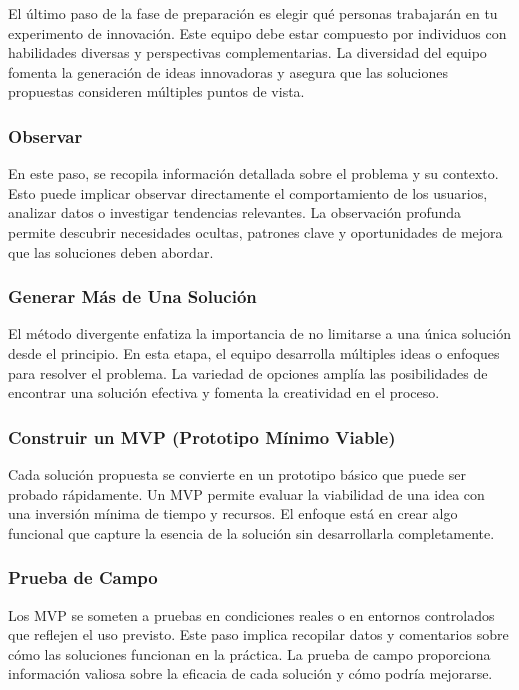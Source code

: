 El último paso de la fase de preparación es elegir qué personas trabajarán en tu
experimento de innovación. Este equipo debe estar compuesto por individuos con habilidades
diversas y perspectivas complementarias. La diversidad del equipo fomenta la
generación de ideas innovadoras y asegura que las soluciones propuestas
consideren múltiples puntos de vista.

\subsubsection{Observar}

En este paso, se recopila información detallada sobre el problema y su contexto.
Esto puede implicar observar directamente el comportamiento de los usuarios,
analizar datos o investigar tendencias relevantes. La observación profunda permite
descubrir necesidades ocultas, patrones clave y oportunidades de mejora que las
soluciones deben abordar.

\subsubsection{Generar Más de Una Solución}

El método divergente enfatiza la importancia de no limitarse a una única solución
desde el principio. En esta etapa, el equipo desarrolla múltiples ideas o enfoques
para resolver el problema. La variedad de opciones amplía las posibilidades de
encontrar una solución efectiva y fomenta la creatividad en el proceso.

\subsubsection{Construir un MVP (Prototipo Mínimo Viable)}

Cada solución propuesta se convierte en un prototipo básico que puede ser probado
rápidamente. Un MVP permite evaluar la viabilidad de una idea con una inversión
mínima de tiempo y recursos. El enfoque está en crear algo funcional que capture
la esencia de la solución sin desarrollarla completamente.

\subsubsection{Prueba de Campo}

Los MVP se someten a pruebas en condiciones reales o en entornos controlados que
reflejen el uso previsto. Este paso implica recopilar datos y comentarios sobre cómo
las soluciones funcionan en la práctica. La prueba de campo proporciona
información valiosa sobre la eficacia de cada solución y cómo podría mejorarse.

